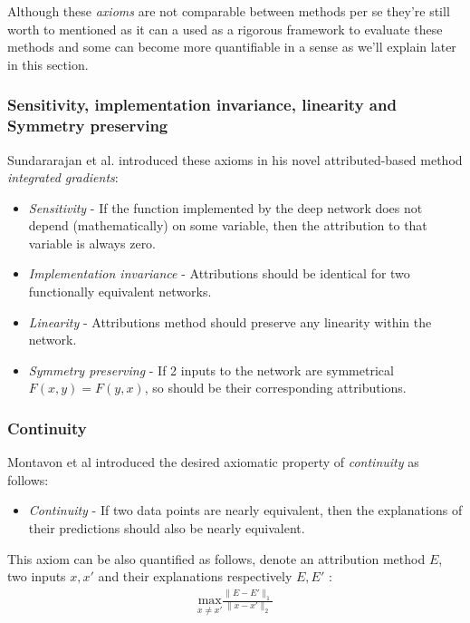 \documentclass[12pt]{report}
\begin{document}
Although these \textit{axioms} are not comparable between methods per se they're still worth to mentioned as it can a used as a rigorous framework to evaluate these methods and some can become more quantifiable in a sense as we'll explain later in this section. \\

\subsubsection{Sensitivity, implementation invariance, linearity and Symmetry preserving}

Sundararajan et al. \cite{DBLP:journals/corr/SundararajanTY17} introduced these axioms in his novel attributed-based method \textit{integrated gradients}:
\begin{itemize}
	\item \textit{Sensitivity} -  If the function implemented by the deep network does not depend (mathematically) on some variable, then the attribution to that variable is always zero.
	\item \textit{Implementation invariance} - Attributions should be identical for two functionally equivalent networks.
	\item \textit{Linearity} - Attributions method should preserve any linearity within the network.
	\item \textit{Symmetry preserving} - If 2 inputs to the network are symmetrical $F(x,y)=F(y,x)$, so should be their corresponding attributions. 
\end{itemize}

\subsubsection{Continuity}
Montavon et al \cite{DBLP:journals/corr/MontavonSM17} introduced the desired axiomatic property of \textit{continuity} as follows:
\begin{itemize}
	\item \textit{Continuity} - If two data points are nearly equivalent, then the explanations of their predictions should also be	nearly equivalent.
\end{itemize}

This axiom can be also quantified as follows, denote an attribution method $E$, two inputs $x,x'$ and their explanations respectively $E,E'$ :
\begin{align*}
	\underset{x \ne x'}{\text{max}} \frac{\| E-E'\|_1}{\| x-x'\|_2}
\end{align*}
\end{document}
